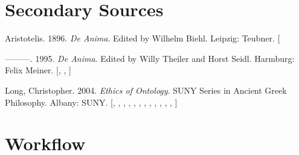 \documentclass[
  12pt,
  a4paper,
  oneside,
  titlepage,
  toclink=all,
  toc=bibliography]{scrbook}
\newlength{\cslhangindent}
\newlength{\cslentryspacingunit} %
\newenvironment{CSLReferences}[2] %
 {%
  \setlength{\parindent}{0pt}
  \ifodd #1
  \let\oldpar\par
  \def\par{\hangindent=\cslhangindent\oldpar}
  \fi
  \setlength{\parskip}{#2\cslentryspacingunit}
 }%
 {}
\theoremstyle{definition}
\theoremstyle{plain}
\theoremstyle{plain}
\theoremstyle{plain}
\theoremstyle{plain}
\theoremstyle{definition}
\theoremstyle{definition}
\theoremstyle{plain}
\theoremstyle{remark}
\begin{document}
\hypertarget{sec-scriv83}{%
\chapter{Secondary Sources}\label{sec-scriv83}}

\hypertarget{refs_scriv83}{}
\begin{CSLReferences}{1}{0}
\leavevmode{}%
Aristotelis. 1896. \emph{De Anima}. Edited by Wilhelm Biehl. Leipzig:
Teubner. {[}\Acrobatmenu{GoBack}{$\hookleftarrow$}{]}

\leavevmode{}%
---------. 1995. \emph{De Anima}. Edited by Willy Theiler and Horst
Seidl. Harmburg: Felix Meiner.
{[},
\protect\hyperlink{cite_93}{\pageref{cite_93}},
\protect\hyperlink{cite_102}{\pageref{cite_102}}{]}

\leavevmode{}%
Long, Christopher. 2004. \emph{Ethics of Ontology}. SUNY Series in
Ancient Greek Philosophy. Albany: SUNY.
{[},
\protect\hyperlink{cite_80}{\pageref{cite_80}},
\protect\hyperlink{cite_81}{\pageref{cite_81}},
\protect\hyperlink{cite_82}{\pageref{cite_82}},
\protect\hyperlink{cite_83}{\pageref{cite_83}},
\protect\hyperlink{cite_84}{\pageref{cite_84}},
\protect\hyperlink{cite_85}{\pageref{cite_85}},
\protect\hyperlink{cite_86}{\pageref{cite_86}},
\protect\hyperlink{cite_87}{\pageref{cite_87}},
\protect\hyperlink{cite_88}{\pageref{cite_88}},
\protect\hyperlink{cite_89}{\pageref{cite_89}},
\protect\hyperlink{cite_90}{\pageref{cite_90}},
\protect\hyperlink{cite_91}{\pageref{cite_91}}{]}

\end{CSLReferences}

\hypertarget{sec-scriv129}{%
\chapter{Workflow}\label{sec-scriv129}}
\end{document}
